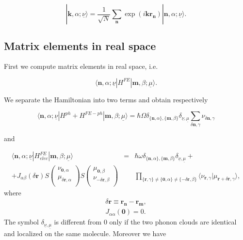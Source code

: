 \documentclass[pt12]{article}
\newcommand{\bfk}{\mathbf{k}}
\newcommand{\bfr}{\mathbf{r}}
\newcommand{\bfn}{\mathbf{n}}
\newcommand{\bfm}{\mathbf{m}}
\begin{document}
\begin{equation}\label{MP_ststes_FT}
| \bfk,\alpha ; \underline{\nu}\rangle=\frac{1}{\sqrt{N}}\sum_\bfn
\exp(i\bfk\bfr_\bfn)|\bfn,\alpha;\underline{\nu}\rangle.
\end{equation}


\subsection{Matrix elements in real space}

First we compute matrix elements in real space, i.e.

\begin{equation}\label{Matrix_elements_def_nm}
\langle \bfn,\alpha ; \underline{\nu} | H^{FE} | \bfm,\beta ;
\underline{\mu} \rangle.
\end{equation}

We separate the Hamiltonian into two terms and obtain respectively

\begin{equation}\label{Matrix_elements_ph_nm}
\langle \bfn,\alpha ; \underline{\nu} | H^{ph}+H^{FE-ph} |
\bfm,\beta ; \underline{\mu} \rangle = \hbar \Omega
\delta_{\{\bfn,\alpha\},\{\bfm,\beta\}} \delta_{\underline{\nu},
\underline{\mu}} \sum_{\delta\bfn,\gamma} \nu_{\delta\bfn,\gamma}
\end{equation}

and

\begin{eqnarray}\label{Matrix_elements_elec_nm}
\langle \bfn,\alpha ; \underline{\nu} | H^{FE}_{elec} | \bfm,\beta ;
\underline{\mu} \rangle &=& \hbar \omega
\delta_{\{\bfn,\alpha\},\{\bfm,\beta\}} \delta_{\underline{\nu},
\underline{\mu}} + \\
 + J_{\alpha\beta}(\delta\bfr) S\left(
                                  \begin{array}{c}
                                    \nu_{\textbf{0},\alpha} \\
                                    \mu_{\delta\bfr,\alpha} \\
                                  \end{array}
                                \right)
 S\left(
                                \begin{array}{c}
                                    \mu_{\textbf{0},\beta} \\
                                    \nu_{-\delta\bfr,\beta} \\
                                  \end{array}
                                \right)
& & \prod_{\{\bfr,\gamma\} \neq \{\textbf{0},\alpha\} \neq
\{-\delta\bfr,\beta\}} \langle
\nu_{\bfr,\gamma}|\mu_{\bfr+\delta\bfr,\gamma} \rangle,
\end{eqnarray}
where
\begin{eqnarray}\label{delta_n_def}
\delta\bfr\equiv \bfr_\bfn-\bfr_\bfm, \\
J_{\alpha\alpha}(\textbf{0})=0.
\end{eqnarray}
The symbol $\delta_{\underline{\nu}, \underline{\mu}}$ is different
from 0 only if the two phonon clouds are identical and localized on the same
molecule. Moreover we have
\end{document}
